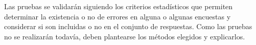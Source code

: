 Las pruebas se validarán siguiendo los criterios estadísticos que permiten determinar la existencia o no de errores en alguna o algunas encuestas y considerar si son incluidas o no en el conjunto de respuestas. Como las pruebas no se realizarán todavía, deben plantearse los métodos elegidos y explicarlos.